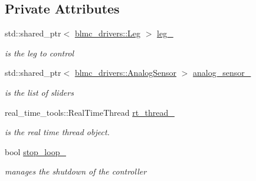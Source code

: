 \subsection*{Private Attributes}
\begin{DoxyCompactItemize}
\item 
std\+::shared\+\_\+ptr$<$ \hyperlink{classblmc__drivers_1_1Leg}{blmc\+\_\+drivers\+::\+Leg} $>$ \hyperlink{classLegController_af2abd6d8c18c9653813bb231a0688a54}{leg\+\_\+}\hypertarget{classLegController_af2abd6d8c18c9653813bb231a0688a54}{}\label{classLegController_af2abd6d8c18c9653813bb231a0688a54}

\begin{DoxyCompactList}\small\item\em is the leg to control \end{DoxyCompactList}\item 
std\+::shared\+\_\+ptr$<$ \hyperlink{classblmc__drivers_1_1AnalogSensor}{blmc\+\_\+drivers\+::\+Analog\+Sensor} $>$ \hyperlink{classLegController_a1a05529b6f3f40c7d3da6e6a9fa94cea}{analog\+\_\+sensor\+\_\+}\hypertarget{classLegController_a1a05529b6f3f40c7d3da6e6a9fa94cea}{}\label{classLegController_a1a05529b6f3f40c7d3da6e6a9fa94cea}

\begin{DoxyCompactList}\small\item\em is the list of sliders \end{DoxyCompactList}\item 
real\+\_\+time\+\_\+tools\+::\+Real\+Time\+Thread \hyperlink{classLegController_a34aac27ee8efb204f98203b553094588}{rt\+\_\+thread\+\_\+}\hypertarget{classLegController_a34aac27ee8efb204f98203b553094588}{}\label{classLegController_a34aac27ee8efb204f98203b553094588}

\begin{DoxyCompactList}\small\item\em is the real time thread object. \end{DoxyCompactList}\item 
bool \hyperlink{classLegController_a991995e57f3581074b9c0eec32966e35}{stop\+\_\+loop\+\_\+}\hypertarget{classLegController_a991995e57f3581074b9c0eec32966e35}{}\label{classLegController_a991995e57f3581074b9c0eec32966e35}

\begin{DoxyCompactList}\small\item\em manages the shutdown of the controller \end{DoxyCompactList}\end{DoxyCompactItemize}


